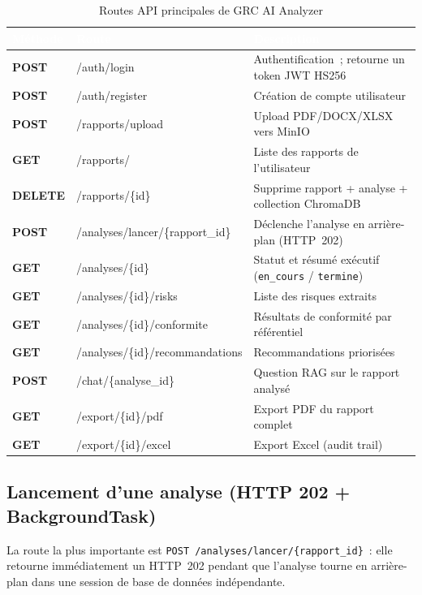 \documentclass[a4paper,12pt,oneside]{report}
\newcommand{\colhead}[1]{\textcolor{white}{\bfseries #1}}
\newcommand{\headrow}{\rowcolor{headerblue}}
\begin{document}
	\begin{table}[H]
		\centering
		\begin{tabularx}{\textwidth}{@{}>{\ttfamily\bfseries}l >{\ttfamily}l X@{}}
			\toprule
			\headrow \colhead{M\'ethode} & \colhead{\rmfamily Route} & \colhead{\rmfamily Description} \\
			\midrule
			POST & /auth/login & Authentification~; retourne un token JWT HS256 \\
			\rowcolor{rowalt} POST & /auth/register & Cr\'eation de compte utilisateur \\
			POST & /rapports/upload & Upload PDF/DOCX/XLSX vers MinIO \\
			\rowcolor{rowalt} GET  & /rapports/ & Liste des rapports de l'utilisateur \\
			DELETE & /rapports/\{id\} & Supprime rapport + analyse + collection ChromaDB \\
			\rowcolor{rowalt} POST & /analyses/lancer/\{rapport\_id\} & D\'eclenche l'analyse en arri\`ere-plan (HTTP~202) \\
			GET  & /analyses/\{id\} & Statut et r\'esum\'e ex\'ecutif (\texttt{en\_cours} / \texttt{termine}) \\
			\rowcolor{rowalt} GET  & /analyses/\{id\}/risks & Liste des risques extraits \\
			GET  & /analyses/\{id\}/conformite & R\'esultats de conformit\'e par r\'ef\'erentiel \\
			\rowcolor{rowalt} GET  & /analyses/\{id\}/recommandations & Recommandations prioris\'ees \\
			POST & /chat/\{analyse\_id\} & Question RAG sur le rapport analys\'e \\
			\rowcolor{rowalt} GET  & /export/\{id\}/pdf & Export PDF du rapport complet \\
			GET  & /export/\{id\}/excel & Export Excel (audit trail) \\
			\bottomrule
		\end{tabularx}
		\caption{Routes API principales de GRC AI Analyzer}
		\label{tab:routes}
	\end{table}
	
	\subsection{Lancement d'une analyse (HTTP 202 + BackgroundTask)}
	
	La route la plus importante est \texttt{POST /analyses/lancer/\{rapport\_id\}}~:
	elle retourne imm\'ediatement un HTTP~202 pendant que l'analyse
	tourne en arri\`ere-plan dans une session de base de donn\'ees ind\'ependante.
	
\end{document}
